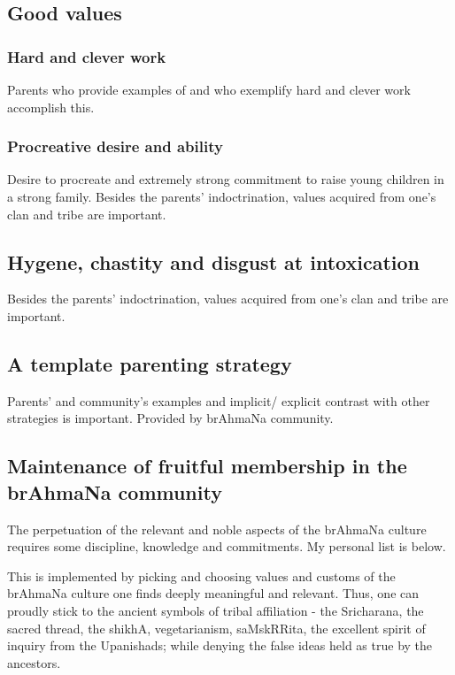 \documentclass[oneside, article]{memoir}
\begin{document}
\subsection{Good values}
\subsubsection{Hard and clever work}
Parents who provide examples of and who exemplify hard and clever work accomplish this.

\subsubsection{Procreative desire and ability}
Desire to procreate and extremely strong commitment to raise young children in a strong family.
\subitem Besides the parents' indoctrination, values acquired from one's clan and tribe are important.

\subsection{Hygene, chastity and disgust at intoxication}
\subitem Besides the parents' indoctrination, values acquired from one's clan and tribe are important.

\subsection{A template parenting strategy}
\subitem Parents' and community's examples and implicit/ explicit contrast with other strategies is important.
\subitem Provided by brAhmaNa community.

\subsection{Maintenance of fruitful membership in the brAhmaNa community}
The perpetuation of the relevant and noble aspects of the brAhmaNa culture requires some discipline, knowledge and commitments. My personal list is below.

This is implemented by picking and choosing values and customs of the brAhmaNa  culture one finds deeply meaningful and relevant. Thus, one can proudly stick to the ancient symbols of tribal affiliation - the Sricharana, the sacred thread, the shikhA, vegetarianism, saMskRRita, the excellent spirit of inquiry from the Upanishads; while denying the false ideas held as true by the ancestors.
\end{document}
